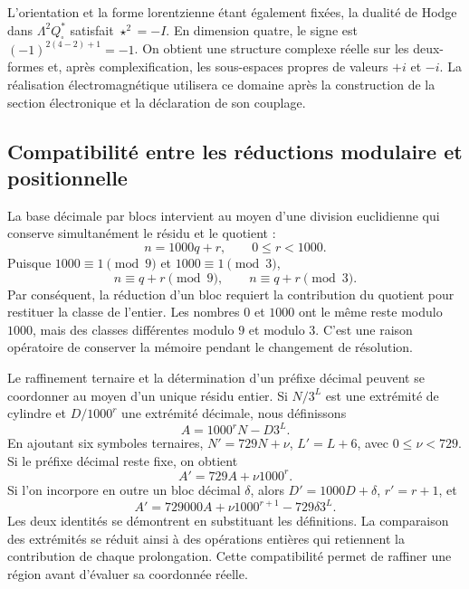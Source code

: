 L'orientation et la forme lorentzienne étant également fixées, la dualité de Hodge dans \(\Lambda^2Q_\square^*\) satisfait \(\star^2=-I\). En dimension quatre, le signe est \((-1)^{2(4-2)+1}=-1\). On obtient une structure complexe réelle sur les deux-formes et, après complexification, les sous-espaces propres de valeurs \(+i\) et \(-i\). La réalisation électromagnétique utilisera ce domaine après la construction de la section électronique et la déclaration de son couplage.

\subsection{Compatibilité entre les réductions modulaire et positionnelle}

La base décimale par blocs intervient au moyen d'une division euclidienne
qui conserve simultanément le résidu et le quotient :
\[
 n=1000q+r,\qquad 0\le r<1000.
\]
Puisque \(1000\equiv1\pmod9\) et \(1000\equiv1\pmod3\),
\[
 n\equiv q+r\pmod9,\qquad n\equiv q+r\pmod3.
\]
Par conséquent, la réduction d'un bloc requiert la contribution du
quotient pour restituer la classe de l'entier. Les nombres \(0\) et
\(1000\) ont le même reste modulo \(1000\), mais des classes différentes
modulo \(9\) et modulo \(3\). C'est une raison opératoire de conserver
la mémoire pendant le changement de résolution.

Le raffinement ternaire et la détermination d'un préfixe décimal
peuvent se coordonner au moyen d'un unique résidu entier. Si \(N/3^L\)
est une extrémité de cylindre et \(D/1000^r\) une extrémité décimale, nous définissons
\[
 A=1000^rN-D3^L.
\]
En ajoutant six symboles ternaires, \(N'=729N+\nu\),
\(L'=L+6\), avec \(0\le\nu<729\). Si le préfixe décimal reste
fixe, on obtient
\[
 A'=729A+\nu1000^r.
\]
Si l'on incorpore en outre un bloc décimal \(\delta\), alors \(D'=1000D+\delta\), \(r'=r+1\), et
\begin{equation}
 A'=729000A+\nu1000^{r+1}-729\delta3^L.
 \label{x_reciprocidad:eq:residuo-dos-bases}
\end{equation}
Les deux identités se démontrent en substituant les définitions. La
comparaison des extrémités se réduit ainsi à des opérations entières qui
retiennent la contribution de chaque prolongation. Cette compatibilité
permet de raffiner une région avant d'évaluer sa coordonnée réelle.




